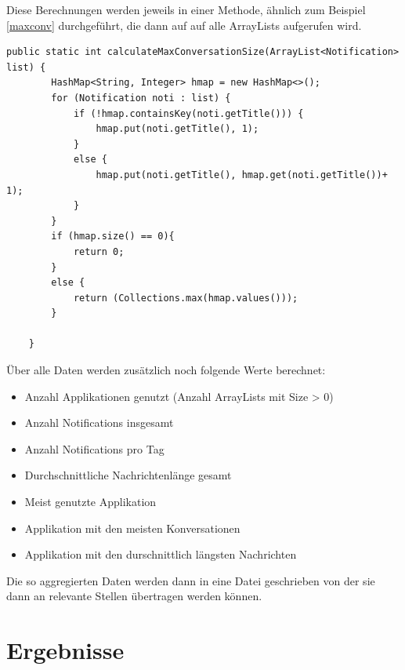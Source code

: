 Diese Berechnungen werden jeweils in einer Methode, ähnlich zum Beispiel \ref{maxconv} durchgeführt, die dann auf auf alle ArrayLists aufgerufen wird.


\begin{lstlisting}[frame=single, caption =  calculateMaxConversationSize(), label=maxconv] 
    public static int calculateMaxConversationSize(ArrayList<Notification> list) {
        HashMap<String, Integer> hmap = new HashMap<>();
        for (Notification noti : list) {
            if (!hmap.containsKey(noti.getTitle())) {
                hmap.put(noti.getTitle(), 1);
            }
            else {
                hmap.put(noti.getTitle(), hmap.get(noti.getTitle())+ 1);
            }
        }
        if (hmap.size() == 0){
            return 0;
        }
        else {
            return (Collections.max(hmap.values()));
        }

    }
\end{lstlisting}


Über alle Daten werden zusätzlich noch folgende Werte berechnet:

\begin{itemize}
  \item Anzahl Applikationen genutzt (Anzahl ArrayLists mit Size > 0)
  \item Anzahl Notifications insgesamt
  \item Anzahl Notifications pro Tag
  \item Durchschnittliche Nachrichtenlänge gesamt
  \item Meist genutzte Applikation
  \item Applikation mit den meisten Konversationen
  \item Applikation mit den durschnittlich längsten Nachrichten  
\end{itemize}

Die so aggregierten Daten werden dann in eine Datei geschrieben von der sie dann an relevante Stellen übertragen werden können.

\section{Ergebnisse}

